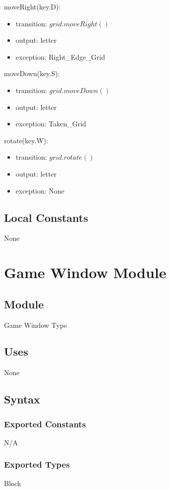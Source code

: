 \documentclass[12pt]{article}
\begin{document}
\noindent moveRight(key.D):
\begin{itemize}
\item transition: $grid.moveRight()$
\item output: letter
\item exception: Right\_Edge\_Grid
\end{itemize}

\noindent moveDown(key.S):
\begin{itemize}
\item transition: $grid.moveDown()$
\item output: letter
\item exception: Taken\_Grid
\end{itemize}

\noindent rotate(key.W):
\begin{itemize}
\item transition: $grid.rotate()$
\item output: letter
\item exception: None
\end{itemize}

\subsection*{Local Constants}
None
\medskip
\newpage

\section* {Game Window Module}

\subsection*{Module}

Game Window Type

\subsection* {Uses}
None
\subsection* {Syntax}

\subsubsection* {Exported Constants}
N/A
\subsubsection* {Exported Types}
Block
\end{document}
